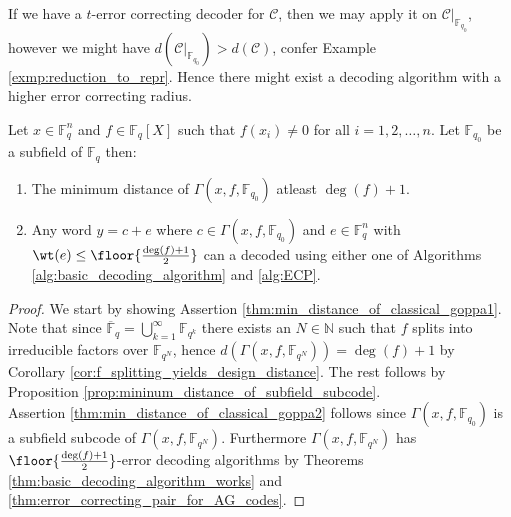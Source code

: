 \begin{remark}
  If we have a $t$-error correcting decoder for $\mathcal{C}$, then we may apply it on $\mathcal{C} \vert_{\mathbb{F}_{q_0}}$, however we might have $d(\mathcal{C} \vert_{\mathbb{F}_{q_0}}) > d(\mathcal{C})$, confer Example \ref{exmp:reduction_to_repr}. Hence there might exist a decoding algorithm with a higher error correcting radius.
\end{remark}

\begin{theorem}\label{thm:min_distance_of_classical_goppa}
  Let $x \in \mathbb{F}_q^{n}$ and $f \in \mathbb{F}_q[X]$ such that $f(x_i) \neq 0$ for all $i = 1, 2, \ldots, n$. Let $\mathbb{F}_{q_0}$ be a subfield of $\mathbb{F}_q$ then:
  \begin{enumerate}
     \item The minimum distance of $\Gamma(x, f, \mathbb{F}_{q_0})$ atleast $\deg(f) + 1$.\label{thm:min_distance_of_classical_goppa1}
     \item Any word $y = c + e$ where $c \in \Gamma(x, f, \mathbb{F}_{q_0})$ and $e \in \mathbb{F}_q^n$ with $\wt(e) \leq \floor{\frac{\deg(f) + 1}{2}}$ can a decoded using either one of Algorithms \ref{alg:basic_decoding_algorithm} and \ref{alg:ECP}.\label{thm:min_distance_of_classical_goppa2}
  \end{enumerate}
\end{theorem}
\begin{proof}
  We start by showing Assertion \ref{thm:min_distance_of_classical_goppa1}. Note that since $\overline{\mathbb{F}}_q = \bigcup_{k = 1}^{\infty} \mathbb{F}_{q^k}$ there exists an $N \in \mathbb{N}$ such that $f$ splits into irreducible factors over $\mathbb{F}_{q^N}$, hence $d\left(\Gamma(x, f, \mathbb{F}_{q^N})\right) = \deg(f) + 1$ by Corollary \ref{cor:f_splitting_yields_design_distance}. The rest follows by Proposition \ref{prop:mininum_distance_of_subfield_subcode}. \\
  Assertion \ref{thm:min_distance_of_classical_goppa2} follows since $\Gamma(x, f, \mathbb{F}_{q_0})$ is a subfield subcode of $\Gamma(x, f, \mathbb{F}_{q^N})$. Furthermore $\Gamma(x, f, \mathbb{F}_{q^N})$ has $\floor{\frac{\deg(f) + 1}{2}}$-error decoding algorithms by Theorems \ref{thm:basic_decoding_algorithm_works} and \ref{thm:error_correcting_pair_for_AG_codes}.
\end{proof}


